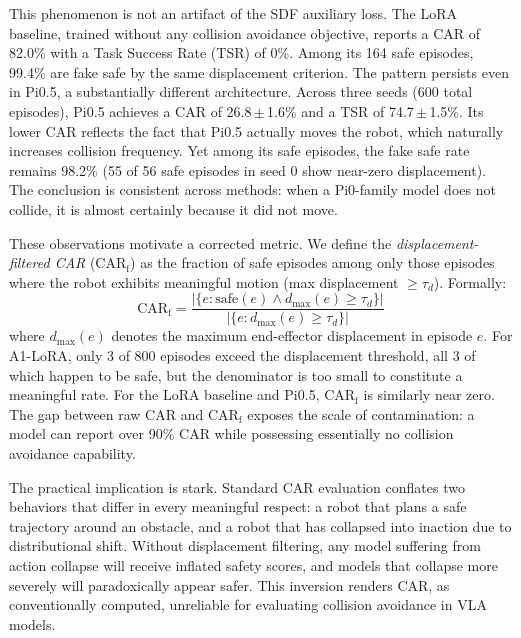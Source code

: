 This phenomenon is not an artifact of the SDF auxiliary loss. The LoRA baseline, trained without any collision avoidance objective, reports a CAR of 82.0\% with a Task Success Rate (TSR) of 0\%. Among its 164 safe episodes, 99.4\% are fake safe by the same displacement criterion. The pattern persists even in Pi0.5, a substantially different architecture. Across three seeds (600 total episodes), Pi0.5 achieves a CAR of 26.8\,$\pm$\,1.6\% and a TSR of 74.7\,$\pm$\,1.5\%. Its lower CAR reflects the fact that Pi0.5 actually moves the robot, which naturally increases collision frequency. Yet among its safe episodes, the fake safe rate remains 98.2\% (55 of 56 safe episodes in seed 0 show near-zero displacement). The conclusion is consistent across methods: when a Pi0-family model does not collide, it is almost certainly because it did not move.

These observations motivate a corrected metric. We define the \emph{displacement-filtered CAR} (CAR$_\text{f}$) as the fraction of safe episodes among only those episodes where the robot exhibits meaningful motion (max displacement $\geq \tau_d$). Formally:
\begin{equation}
\text{CAR}_\text{f} = \frac{|\{e : \text{safe}(e) \land d_{\max}(e) \geq \tau_d\}|}{|\{e : d_{\max}(e) \geq \tau_d\}|}
\end{equation}
where $d_{\max}(e)$ denotes the maximum end-effector displacement in episode $e$. For A1-LoRA, only 3 of 800 episodes exceed the displacement threshold, all 3 of which happen to be safe, but the denominator is too small to constitute a meaningful rate. For the LoRA baseline and Pi0.5, CAR$_\text{f}$ is similarly near zero. The gap between raw CAR and CAR$_\text{f}$ exposes the scale of contamination: a model can report over 90\% CAR while possessing essentially no collision avoidance capability.

The practical implication is stark. Standard CAR evaluation conflates two behaviors that differ in every meaningful respect: a robot that plans a safe trajectory around an obstacle, and a robot that has collapsed into inaction due to distributional shift. Without displacement filtering, any model suffering from action collapse will receive inflated safety scores, and models that collapse more severely will paradoxically appear safer. This inversion renders CAR, as conventionally computed, unreliable for evaluating collision avoidance in VLA models.
